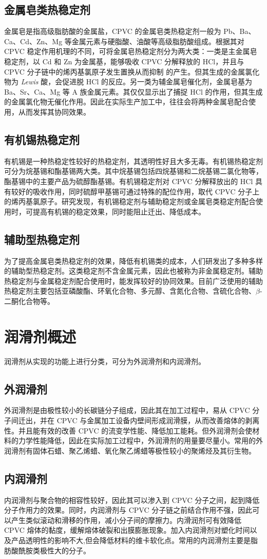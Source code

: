 \subsection{金属皂类热稳定剂}
金属皂是指高级脂肪酸的金属盐，CPVC 的金属皂类热稳定剂一般为 Pb、Ba、Ca、Cd、Zn、Mg 等金属元素与硬脂酸、油酸等高级脂肪酸组成\cite{5}。根据其对 CPVC 稳定作用机理的不同，可将金属皂热稳定剂分为两大类：一类是主金属皂稳定剂，以 Cd 和 Zn 为金属基，能够吸收 CPVC 分解释放的 HCl，并且与 CPVC 分子链中的烯丙基氯原子发生置换从而抑制 \; 的产生。但其生成的金属氯化物为 \textit{Lewis} 酸，会促进脱 HCl 的反应。另一类为辅金属皂催化剂，金属皂基为 Ba、Sr、Ca、Mg 等 \uppercase\expandafter{}A 族金属元素。其仅仅显示出了捕捉 HCl 的作用，但其生成的金属氯化物无催化作用。因此在实际生产加工中，往往会将两种金属皂配合使用，从而发挥其协同效果。

\subsection{有机锡热稳定剂}

有机锡是一种热稳定性较好的热稳定剂，其透明性好且大多无毒。有机锡热稳定剂可分为烷基锡和酯基锡两大类。其中烷基锡包括四烷基锡和二烷基锡二氯化物等，酯基锡中的主要产品为硫醇酯基锡。有机锡稳定剂对 CPVC 分解释放出的 HCl 具有较好的吸收作用，同时硫醇甲基锡可通过特殊的配位作用，取代 CPVC 分子上的烯丙基氯原子\cite{29}。研究发现，有机锡稳定剂与辅助稳定剂或金属皂类稳定剂配合使用时，可提高有机锡的稳定效果，同时能阻止迁出、降低成本\cite{30}。

\subsection{辅助型热稳定剂}
为了提高金属皂类热稳定剂的效果，降低有机锡类的成本，人们研发出了多种多样的辅助型热稳定剂。这类稳定剂不含金属元素，因此也被称为非金属稳定剂。辅助热稳定剂与金属稳定剂配合使用时，能发挥较好的协同效果。目前广泛使用的辅助热稳定剂主要包括亚磷酸酯、环氧化合物、多元醇、含氮化合物、含硫化合物、$\beta$-二酮化合物等\cite{26}。

\section{润滑剂概述}

润滑剂从实现的功能上进行分类，可分为外润滑剂和内润滑剂。

\subsection{外润滑剂}
外润滑剂是由极性较小的长碳链分子组成，因此其在加工过程中，易从 CPVC 分子间迁出，并在 CPVC 与金属加工设备内壁间形成润滑膜，从而改善熔体的剥离性。并且能有效的改善 CPVC 的流变学性能、降低加工能耗。但外润滑剂会使材料的力学性能降低，因此在实际加工过程中，外润滑剂的用量要尽量小。常用的外润滑剂有固体石蜡、聚乙烯蜡、氧化聚乙烯蜡等极性较小的聚烯烃及其衍生物。

\subsection{内润滑剂}
内润滑剂与聚合物的相容性较好，因此其可以渗入到 CPVC 分子之间，起到降低分子作用力的效果。同时，内润滑剂与 CPVC 分子链之前结合作用不强，因此可以产生类似滚动和滑移的作用，减小分子间的摩擦力。内滑润剂可有效降低 CPVC 熔体的黏度，缓解熔体破裂和出膜膨胀现象。加入内润滑剂对塑化时间以及产品透明性的影响不大,但会降低材料的维卡软化点。常用的内润滑剂主要是脂肪酸酰胺类极性大的分子。